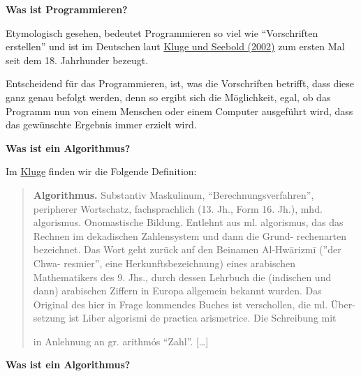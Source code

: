 \vspace{0.5cm}\par\noindent\textbf{Was ist Programmieren?}\vspace{0.5cm}

Etymologisch gesehen, bedeutet Programmieren so viel wie ``Vorschriften
erstellen'' und ist im Deutschen laut
\href{http://bibliography.lingpy.org?key=Kluge2002}{Kluge und Seebold
(2002)} zum ersten Mal seit dem 18. Jahrhunder bezeugt.

Entscheidend für das Programmieren, ist, was die Vorschriften betrifft,
dass diese ganz genau befolgt werden, denn so ergibt sich die
Möglichkeit, egal, ob das Programm nun von einem Menschen oder einem
Computer ausgeführt wird, dass das gewünschte Ergebnis immer erzielt
wird.



\vspace{0.5cm}\par\noindent\textbf{Was ist ein Algorithmus?}\vspace{0.5cm}

{Im \href{http://bibliography.lingpy.org?key=Kluge2002}{Kluge} finden
wir die Folgende Definition:}

\begin{quote}
\vspace{0.5cm}\par\noindent\textbf{Algorithmus.} Substantiv Maskulinum, ``Berechnungsverfahren'',\vspace{0.5cm}
peripherer Wortschatz, fachsprachlich (13. Jh., Form 16. Jh.), mhd.
algorismus. Onomastische Bildung. Entlehnt aus ml. algorismus, das das
Rechnen im dekadischen Zahlensystem und dann die Grund- rechenarten
bezeichnet. Das Wort geht zurück auf den Beinamen Al-Hwārizmī (''der
Chwa- resmier'', eine Herkunftsbezeichnung) eines arabischen
Mathematikers des 9. Jhs., durch dessen Lehrbuch die (indischen und
dann) arabischen Ziffern in Europa allgemein bekannt wurden. Das
Original des hier in Frage kommendes Buches ist verschollen, die ml.
Über- setzung ist Liber algorismi de practica arismetrice. Die
Schreibung mit

in Anlehnung an gr. arithmós ``Zahl''. {[}\ldots{}{]}
\end{quote}



\vspace{0.5cm}\par\noindent\textbf{Was ist ein Algorithmus?}\vspace{0.5cm}

